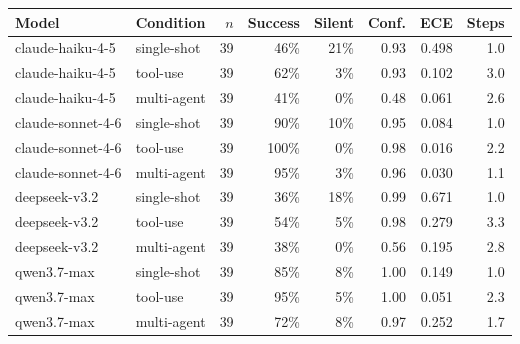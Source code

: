 \begin{tabular}{llrrrrrr}
\toprule
Model & Condition & $n$ & Success & Silent & Conf. & ECE & Steps \\
\midrule
claude-haiku-4-5 & single-shot & 39 & 46\% & 21\% & 0.93 & 0.498 & 1.0 \\
claude-haiku-4-5 & tool-use & 39 & 62\% & 3\% & 0.93 & 0.102 & 3.0 \\
claude-haiku-4-5 & multi-agent & 39 & 41\% & 0\% & 0.48 & 0.061 & 2.6 \\
\addlinespace
claude-sonnet-4-6 & single-shot & 39 & 90\% & 10\% & 0.95 & 0.084 & 1.0 \\
claude-sonnet-4-6 & tool-use & 39 & 100\% & 0\% & 0.98 & 0.016 & 2.2 \\
claude-sonnet-4-6 & multi-agent & 39 & 95\% & 3\% & 0.96 & 0.030 & 1.1 \\
\addlinespace
deepseek-v3.2 & single-shot & 39 & 36\% & 18\% & 0.99 & 0.671 & 1.0 \\
deepseek-v3.2 & tool-use & 39 & 54\% & 5\% & 0.98 & 0.279 & 3.3 \\
deepseek-v3.2 & multi-agent & 39 & 38\% & 0\% & 0.56 & 0.195 & 2.8 \\
\addlinespace
qwen3.7-max & single-shot & 39 & 85\% & 8\% & 1.00 & 0.149 & 1.0 \\
qwen3.7-max & tool-use & 39 & 95\% & 5\% & 1.00 & 0.051 & 2.3 \\
qwen3.7-max & multi-agent & 39 & 72\% & 8\% & 0.97 & 0.252 & 1.7 \\
\bottomrule
\end{tabular}
